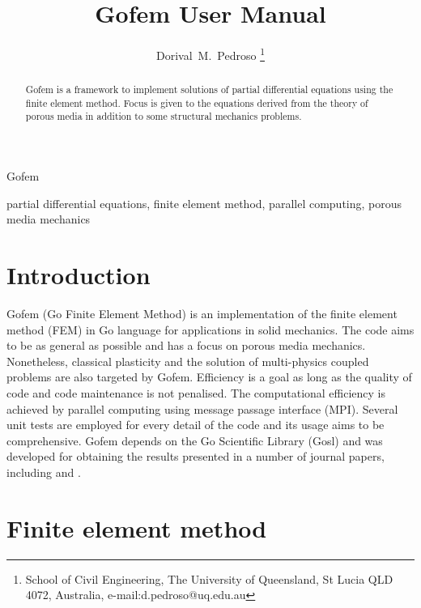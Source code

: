 \documentclass[twoside,journal]{IEEEtran}
\begin{document}
\title{Gofem User Manual}

\author{Dorival~M.~Pedroso%
\thanks{School of Civil Engineering, The University of Queensland, St Lucia QLD 4072, Australia,
e-mail:d.pedroso@uq.edu.au}}

{Gofem}

\maketitle




\begin{abstract}

Gofem is a framework to implement solutions of partial differential equations using the finite
element method. Focus is given to the equations derived from the theory of porous media in addition
to some structural mechanics problems.

\end{abstract}

\begin{IEEEkeywords}
partial differential equations, finite element method, parallel computing, porous media mechanics
\end{IEEEkeywords}



\section{Introduction}
\label{sec:intro}

Gofem (Go Finite Element Method) is an implementation of the finite element method (FEM) in Go
language for applications in solid mechanics. The code aims to be as general as possible and has a
focus on porous media mechanics. Nonetheless, classical plasticity and the solution of multi-physics
coupled problems are also targeted by Gofem. Efficiency is a goal as long as the quality of code and
code maintenance is not penalised. The computational efficiency is achieved by parallel computing
using message passage interface (MPI). Several unit tests are employed for every detail of the code
and its usage aims to be comprehensive. Gofem depends on the Go Scientific Library (Gosl) and was
developed for obtaining the results presented in a number of journal papers, including
\cite{pedroso:15a} and \cite{pedroso:15b}.



\section{Finite element method}
\end{document}
